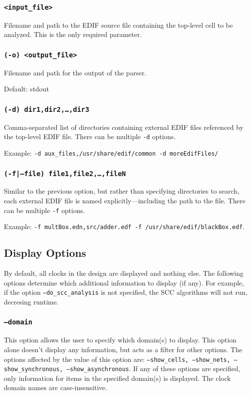 \documentclass[english]{article}
\begin{document}
\subsubsection{\texttt{<input\_file>}}
Filename and path to the EDIF source file containing the top-level cell to be
analyzed. This is the only required parameter.

\subsubsection{\texttt{(-o) <output\_file>}}
Filename and path for the output of the parser.

Default: stdout

\subsubsection{\texttt{(-d) dir1,dir2,\ldots,dir3}}
Comma-separated list of directories containing external EDIF files referenced 
by the top-level EDIF file. There can be multiple \texttt{-d} options.

Example: \texttt{-d aux\_files,/usr/share/edif/common -d moreEdifFiles/}

\subsubsection{\texttt{(-f|--file) file1,file2,\ldots,fileN}}
Similar to the previous option, but rather than specifying directories to 
search, each external EDIF file is named explicitly---including the path to the 
file. There can be multiple \texttt{-f} options. 

Example: \texttt{-f multBox.edn,src/adder.edf -f /usr/share/edif/blackBox.edf}.

\subsection{Display Options}
By default, all clocks in the design are displayed and nothing else. The
following options determine which additional information to display (if any).
For example, if the option  \texttt{--do\_scc\_analysis} is not specified, the
SCC algorithms will not run, decresing runtime.

\subsubsection{\texttt{--domain}}
This option allows the user to specify which domain(s) to display.  This option
alone doesn't display any information, but acts as a filter for other options. 
The options affected by the value of this option are:
\texttt{--show\_cells, --show\_nets, --show\_synchronous, --show\_asynchronous}.
If any of these options are specified, only information for items in the
specified domain(s) is displayed. The clock domain names are case-insensitive.
\end{document}
